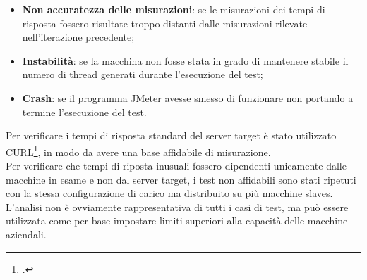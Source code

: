 \begin{itemize}
	\item \textbf{Non accuratezza delle misurazioni}: se le misurazioni dei tempi di risposta fossero risultate troppo distanti dalle misurazioni rilevate nell'iterazione precedente;
	\item \textbf{Instabilità}: se la macchina non fosse stata in grado di mantenere stabile il numero di thread generati durante l'esecuzione del test;
	\item \textbf{Crash}: se il programma JMeter avesse smesso di funzionare non portando a termine l'esecuzione del test.
\end{itemize}
Per verificare i tempi di risposta standard del server target è stato utilizzato CURL\footcite{site:curl}, in modo da avere una base affidabile di misurazione.\\
Per verificare che tempi di riposta inusuali fossero dipendenti unicamente dalle macchine in esame e non dal server target, i test non affidabili sono stati ripetuti con la stessa configurazione di carico ma distribuito su più macchine slaves.\\
L'analisi non è ovviamente rappresentativa di tutti i casi di test, ma può essere utilizzata come per base impostare limiti superiori alla capacità delle macchine aziendali.